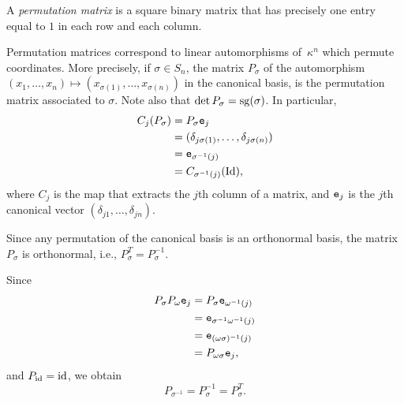 \begin{defn}
    A \textsl{permutation matrix} is a square binary matrix that has precisely one entry equal to $1$ in each row and each column.
\end{defn}

\begin{rem}
    Permutation matrices correspond to linear automorphisms of~$\kappa^n$ which permute coordinates. More precisely, if $\sigma\in S_n$, the matrix $P_\sigma$ of the automorphism $(x_1,\dots,x_n)\mapsto(x_{\sigma(1)},\dots,x_{\sigma(n)})$ in the canonical basis, is the permutation matrix associated to $\sigma$. Note also that $\det P_{\sigma}=\operatorname{sg}(\sigma)$. In particular,
    \begin{align*}
        C_j(P_\sigma) &= P_\sigma\mathtt e_j\\
            &= (\delta_{j\sigma(1)},\dots,\delta_{j\sigma(n)})\\
            &= \mathtt e_{\sigma^{-1}(j)}\\
            &= C_{\sigma^{-1}(j)}(\operatorname{Id}),
    \end{align*}
    where $C_j$ is the map that extracts the $j$th column of a matrix, and $\mathtt e_j$ is the $j$th canonical vector $(\delta_{j1},\dots,\delta_{jn})$.

    Since any permutation of the canonical basis is an orthonormal basis, the matrix $P_\sigma$ is orthonormal, i.e., $P_\sigma^T=P_\sigma^{-1}$.

    Since
    \begin{align*}
        P_\sigma P_\omega\mathtt e_j
            &= P_\sigma\mathtt e_{\omega^{-1}(j)}\\
            &= \mathtt e_{\sigma^{-1}\omega^{-1}(j)}\\
            &= \mathtt e_{(\omega\sigma)^{-1}(j)}\\
            &= P_{\omega\sigma}\mathtt e_j,
    \end{align*}
    and $P_{\operatorname{id}}=\operatorname{id}$, we obtain
    $$
        P_{\sigma^{-1}}=P_\sigma^{-1}=P_\sigma^T.
    $$
\end{rem}

